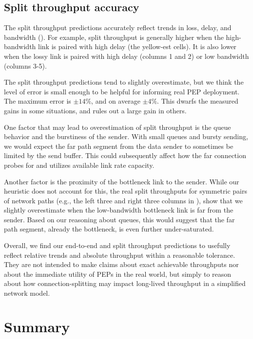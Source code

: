 \subsection{Split throughput accuracy}
\label{sec:splitting:accuracy:split}

The split throughput predictions accurately reflect trends in loss, delay, and
bandwidth (). For example, split throughput is
generally higher when the high-bandwidth link is paired with high delay
(the yellow-est cells). It is also lower when the lossy link is paired with
high delay (columns 1 and 2) or low bandwidth (columns 3-5).

The split throughput predictions tend to slightly overestimate, but we think
the level of error is small enough to be helpful for informing real PEP
deployment. The maximum error is $\pm14\%$, and on average $\pm4\%$. This
dwarfs the measured gains in some situations, and rules out a large gain in
others.

One factor that may lead to overestimation of split throughput is the queue
behavior and the burstiness of the sender. With small queues and bursty
sending, we would expect the far path segment from the data sender to sometimes
be limited by the send buffer. This could subsequently affect how the far
connection probes for and utilizes available link rate capacity.

Another factor is the proximity of the bottleneck link to the sender. While
our heuristic does not account for this, the real split throughputs for
symmetric pairs of network paths (e.g., the left three and right three columns
in ), show that we slightly overestimate
when the low-bandwidth bottleneck link is far from the sender.
Based on our reasoning about queues, this would suggest that the far path
segment, already the bottleneck, is even further under-saturated.

Overall, we find our end-to-end and split throughput predictions to usefully
reflect relative trends and absolute throughput within a
reasonable tolerance. They are not intended to make claims about exact achievable
throughputs nor about the immediate utility of PEPs in the real world,
but simply to reason about how connection-splitting may impact
long-lived throughput in a simplified network model.

\section{Summary}
\label{sec:splitting:summary}

